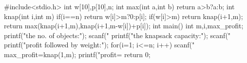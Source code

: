 #include<stdio.h> 
int w[10],p[10],n; 
int max(int a,int b) 
{ 
return a>b?a:b; 
} 
int knap(int i,int m) 
{ 
if(i==n) return w[i]>m?0:p[i]; 
if(w[i]>m) return knap(i+1,m); 
return max(knap(i+1,m),knap(i+1,m-w[i])+p[i]); 
} 
int main() 
{ 
int m,i,max_profit; 
printf("\nEnter the no. of objects:"); 
scanf("%
printf("\nEnter the knapsack capacity:"); 
scanf("%
printf("\nEnter profit followed by weight:\n"); 
for(i=1; i<=n; i++) 
scanf("%
max_profit=knap(1,m); 
printf("\nMax profit=%
return 0; 
} 
